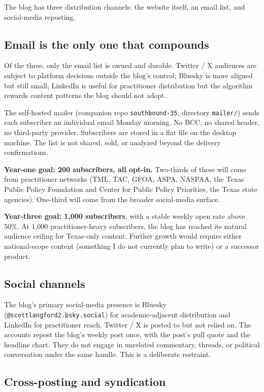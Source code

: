 \documentclass[11pt]{article}
\begin{document}
The blog has three distribution channels: the website itself, an
email list, and social-media reposting.

\subsection{Email is the only one that compounds}

Of the three, only the email list is owned and durable. Twitter /
X audiences are subject to platform decisions outside the blog's
control; Bluesky is more aligned but still small; LinkedIn is
useful for practitioner distribution but the algorithm rewards
content patterns the blog should not adopt.

The self-hosted mailer (companion repo \texttt{southbound-35},
directory \texttt{mailer/}) sends each subscriber an individual
email Monday morning. No BCC, no shared header, no third-party
provider. Subscribers are stored in a flat file on the desktop
machine. The list is not shared, sold, or analyzed beyond the
delivery confirmations.

\textbf{Year-one goal: 200 subscribers, all opt-in.} Two-thirds
of these will come from practitioner networks (TML, TAC, GFOA,
ASPA, NASPAA, the Texas Public Policy Foundation and Center for
Public Policy Priorities, the Texas state agencies). One-third
will come from the broader social-media surface.

\textbf{Year-three goal: 1{,}000 subscribers}, with a stable
weekly open rate above 50\%. At 1{,}000 practitioner-heavy
subscribers, the blog has reached its natural audience ceiling
for Texas-only content. Further growth would require either
national-scope content (something I do not currently plan to
write) or a successor product.

\subsection{Social channels}

The blog's primary social-media presence is Bluesky
(\texttt{@scottlangford2.bsky.social}) for academic-adjacent
distribution and LinkedIn for practitioner reach. Twitter / X is
posted to but not relied on. The accounts repost the blog's
weekly post once, with the post's pull quote and the headline
chart. They do not engage in unrelated commentary, threads, or
political conversation under the same handle. This is a
deliberate restraint.

\subsection{Cross-posting and syndication}
\end{document}

